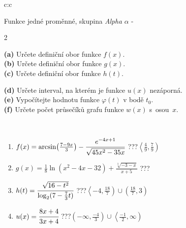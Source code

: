 \documentclass[10pt]{report}
\begin{document}
\thispagestyle{empty}
\begin{tabular}{c:c}
\begin{minipage}[c][104.5mm][t]{0.5\linewidth}
\begin{center}
\vspace{7mm}
{\huge Funkce jedné proměnné, skupina \textit{Alpha $\alpha$} -}\\[5mm]
\begin{minipage}{0.95\linewidth}
\begin{center}
{\small \begin{multicols}{2} \raggedright
\textbf{(a)} Určete definiční obor funkce \(f(x)\). \\[1mm]
\textbf{(b)} Určete definiční obor funkce \(g(x)\). \\[1mm]
\textbf{(c)} Určete definiční obor funkce \(h(t)\). \par \columnbreak
\textbf{(d)} Určete interval, na kterém je funkce \(u(x)\) nezáporná. \\[1mm]
\textbf{(e)} Vypočítejte hodnotu funkce \(\varphi(t)\) v bodě \(t_0\). \\[1mm]
\textbf{(f)} Určete počet průsečíků grafu funkce \(w(x)\) s~osou~\(x\). \\[1mm]
\end{multicols}
}
\end{center}
\end{minipage}
\\[4mm]
\begin{minipage}{0.79\linewidth}
\begin{center}
\begin{varwidth}{\linewidth}
\begin{enumerate}
\small
\item $f(x) = \arcsin\!\left( \frac{7-9x}{3} \right) - \cfrac{e^{-4x+1}}{\sqrt{45x^2-35x}}$\quad \dotfill\; ???\;\dotfill \quad $\left\langle\frac{4}{9} , \frac{7}{9}\right)$
\item $g(x) = \frac{1}{8} \ln{\!(x^2-4x-32)}+\frac{\sqrt[3]{-3-x}}{x+5}$\quad \dotfill\; ???\;\dotfill {}
\item $h(t) = \cfrac{\sqrt{16-t^2}}{\log_2(7-\frac{7}{3}t)}$\quad \dotfill\; ???\;\dotfill \quad $\left\langle-4 , \frac{18}{7}\right)\cup\left(\frac{18}{7} , 3\right)$
\item $u(x) = \cfrac{8x+4}{3x+4}$\quad \dotfill\; ???\;\dotfill \quad $\left(-\infty , \frac{-4}{3}\right)\cup\left\langle\frac{-1}{2} , \infty\right)$

\end{enumerate}
\end{varwidth}
\end{center}
\end{minipage}
\end{center}
\end{minipage}
\end{tabular}
\end{document}
